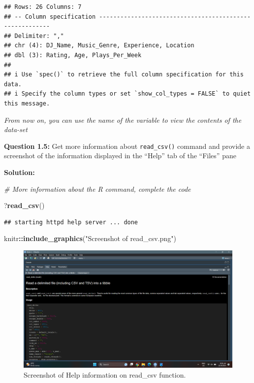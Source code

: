 \documentclass[
]{article}
\newenvironment{Shaded}{\begin{snugshade}}{\end{snugshade}}
\newcommand{\CommentTok}[1]{\textcolor[rgb]{0.56,0.35,0.01}{\textit{#1}}}
\newcommand{\FunctionTok}[1]{\textcolor[rgb]{0.13,0.29,0.53}{\textbf{#1}}}
\newcommand{\NormalTok}[1]{#1}
\newcommand{\SpecialCharTok}[1]{\textcolor[rgb]{0.81,0.36,0.00}{\textbf{#1}}}
\newcommand{\StringTok}[1]{\textcolor[rgb]{0.31,0.60,0.02}{#1}}
\begin{document}
\begin{verbatim}
## Rows: 26 Columns: 7
## -- Column specification --------------------------------------------------------
## Delimiter: ","
## chr (4): DJ_Name, Music_Genre, Experience, Location
## dbl (3): Rating, Age, Plays_Per_Week
## 
## i Use `spec()` to retrieve the full column specification for this data.
## i Specify the column types or set `show_col_types = FALSE` to quiet this message.
\end{verbatim}

\emph{From now on, you can use the name of the variable to view the
contents of the data-set}

\textbf{Question 1.5:} Get more information about \texttt{read\_csv()}
command and provide a screenshot of the information displayed in the
``Help'' tab of the ``Files'' pane

\textbf{Solution:}

\begin{Shaded}
\begin{Highlighting}[]
\CommentTok{\# More information about the R command, complete the code}

\NormalTok{?}\FunctionTok{read\_csv}\NormalTok{()}
\end{Highlighting}
\end{Shaded}

\begin{verbatim}
## starting httpd help server ... done
\end{verbatim}

\begin{Shaded}
\begin{Highlighting}[]
\NormalTok{knitr}\SpecialCharTok{::}\FunctionTok{include\_graphics}\NormalTok{(}\StringTok{"Screenshot of read\_csv.png"}\NormalTok{)}
\end{Highlighting}
\end{Shaded}

\begin{figure}
\includegraphics[width=1\linewidth,height=1\textheight]{Screenshot of read_csv} \caption{Screenshot of Help information on read_csv function.}\label{fig:unnamed-chunk-5}
\end{figure}
\end{document}
